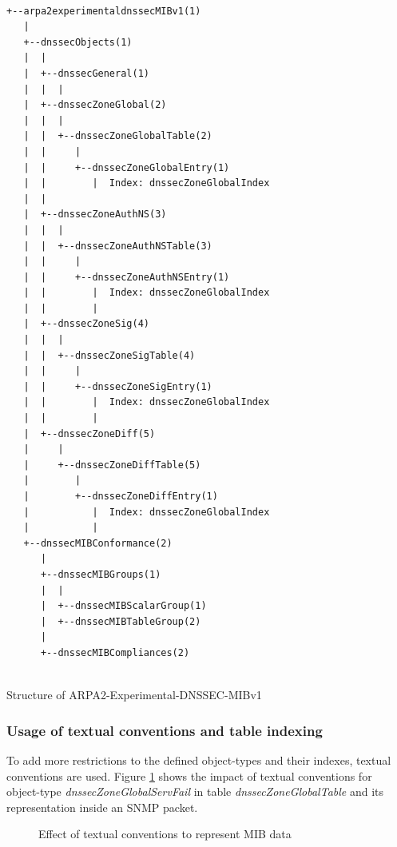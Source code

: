 \begin{listing}
\small\begin{verbatim}

+--arpa2experimentaldnssecMIBv1(1)
   |
   +--dnssecObjects(1)
   |  |
   |  +--dnssecGeneral(1)
   |  |  |
   |  +--dnssecZoneGlobal(2)
   |  |  |
   |  |  +--dnssecZoneGlobalTable(2)
   |  |     |
   |  |     +--dnssecZoneGlobalEntry(1)
   |  |        |  Index: dnssecZoneGlobalIndex
   |  |
   |  +--dnssecZoneAuthNS(3)
   |  |  |
   |  |  +--dnssecZoneAuthNSTable(3)
   |  |     |
   |  |     +--dnssecZoneAuthNSEntry(1)
   |  |        |  Index: dnssecZoneGlobalIndex
   |  |        |
   |  +--dnssecZoneSig(4)
   |  |  |
   |  |  +--dnssecZoneSigTable(4)
   |  |     |
   |  |     +--dnssecZoneSigEntry(1)
   |  |        |  Index: dnssecZoneGlobalIndex
   |  |        |
   |  +--dnssecZoneDiff(5)
   |     |
   |     +--dnssecZoneDiffTable(5)
   |        |
   |        +--dnssecZoneDiffEntry(1)
   |           |  Index: dnssecZoneGlobalIndex
   |           |
   +--dnssecMIBConformance(2)
      |
      +--dnssecMIBGroups(1)
      |  |
      |  +--dnssecMIBScalarGroup(1)
      |  +--dnssecMIBTableGroup(2)
      |
      +--dnssecMIBCompliances(2)


\end{verbatim}
\normalsize
\caption{Structure of ARPA2-Experimental-DNSSEC-MIBv1}
\label{listing:snmptranslate}
\end{listing}  


\subsubsection{Usage of textual conventions and table indexing}

To add more restrictions to the defined object-types and their indexes, textual conventions are used. Figure \ref{figure:textual-conventions} shows the impact of textual conventions for object-type \textit{dnssecZoneGlobalServFail} in table \textit{dnssecZoneGlobalTable} and its representation inside an SNMP packet.    


\begin{figure}[htp] 
\caption{Effect of textual conventions to represent MIB data}
\label{figure:textual-conventions}
\end{figure}

